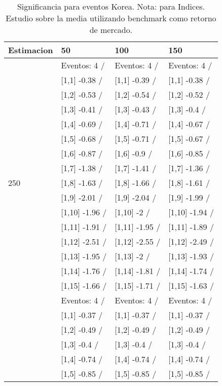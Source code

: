 \begin{table}

\caption{Significancia para eventos Korea. Nota: para Indices. Estudio sobre la media utilizando benchmark como retorno de mercado.}
\centering
\begin{tabular}[t]{llll}
\toprule
Estimacion & 50 & 100 & 150\\
\midrule
 & Eventos:  4 / & Eventos:  4 / & Eventos:  4 /\\
 & {}[1,1] -0.38  / & {}[1,1] -0.39  / & {}[1,1] -0.38  /\\
 & {}[1,2] -0.53  / & {}[1,2] -0.54  / & {}[1,2] -0.52  /\\
 & {}[1,3] -0.41  / & {}[1,3] -0.43  / & {}[1,3] -0.4  /\\
 & {}[1,4] -0.69  / & {}[1,4] -0.71  / & {}[1,4] -0.67  /\\
\addlinespace
 & {}[1,5] -0.68  / & {}[1,5] -0.71  / & {}[1,5] -0.67  /\\
 & {}[1,6] -0.87  / & {}[1,6] -0.9  / & {}[1,6] -0.85  /\\
 & {}[1,7] -1.38  / & {}[1,7] -1.41  / & {}[1,7] -1.36  /\\
250 & {}[1,8] -1.63  / & {}[1,8] -1.66  / & {}[1,8] -1.61  /\\
 & {}[1,9] -2.01  / & {}[1,9] -2.04  / & {}[1,9] -1.99  /\\
\addlinespace
 & {}[1,10] -1.96  / & {}[1,10] -2  / & {}[1,10] -1.94  /\\
 & {}[1,11] -1.91  / & {}[1,11] -1.95  / & {}[1,11] -1.89  /\\
 & {}[1,12] -2.51  / & {}[1,12] -2.55  / & {}[1,12] -2.49  /\\
 & {}[1,13] -1.95  / & {}[1,13] -2  / & {}[1,13] -1.93  /\\
 & {}[1,14] -1.76  / & {}[1,14] -1.81  / & {}[1,14] -1.74  /\\
\addlinespace
 & {}[1,15] -1.66  / & {}[1,15] -1.71  / & {}[1,15] -1.63  /\\
 & Eventos:  4 / & Eventos:  4 / & Eventos:  4 /\\
 & {}[1,1] -0.37  / & {}[1,1] -0.37  / & {}[1,1] -0.37  /\\
 & {}[1,2] -0.49  / & {}[1,2] -0.49  / & {}[1,2] -0.49  /\\
 & {}[1,3] -0.4  / & {}[1,3] -0.4  / & {}[1,3] -0.4  /\\
\addlinespace
 & {}[1,4] -0.74  / & {}[1,4] -0.74  / & {}[1,4] -0.74  /\\
 & {}[1,5] -0.85  / & {}[1,5] -0.85  / & {}[1,5] -0.85  /\\

\end{tabular}
\end{table}
